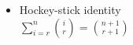 \begin{itemize}
\item Hockey-stick identity \\
$\sum_{i=r}^{n}\binom{i}{r} = \binom{n+1}{r+1}$
\end{itemize}